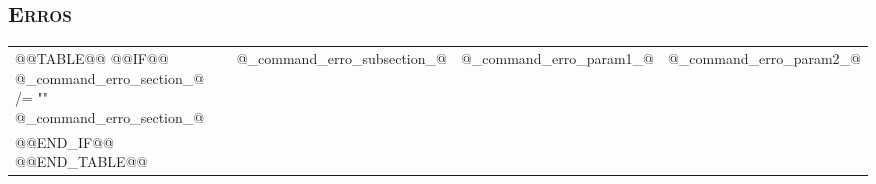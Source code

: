 \documentclass{article}
\begin{document}
	\subsection{\textsc{Erros}}
	
	
		\begin{center}
			\begin{xtabular}{l | l | p{.3\textwidth} | p{.3\textwidth}}
				@@TABLE@@
					@@IF@@ @_command_erro_section_@ /= ""
						@_command_erro_section_@	& 
						@_command_erro_subsection_@	& 
						@_command_erro_param1_@	& 
						@_command_erro_param2_@ \\
					@@END_IF@@
				@@END_TABLE@@
			\end{xtabular}
		\end{center}

\noindent\dotfill
\end{document}

